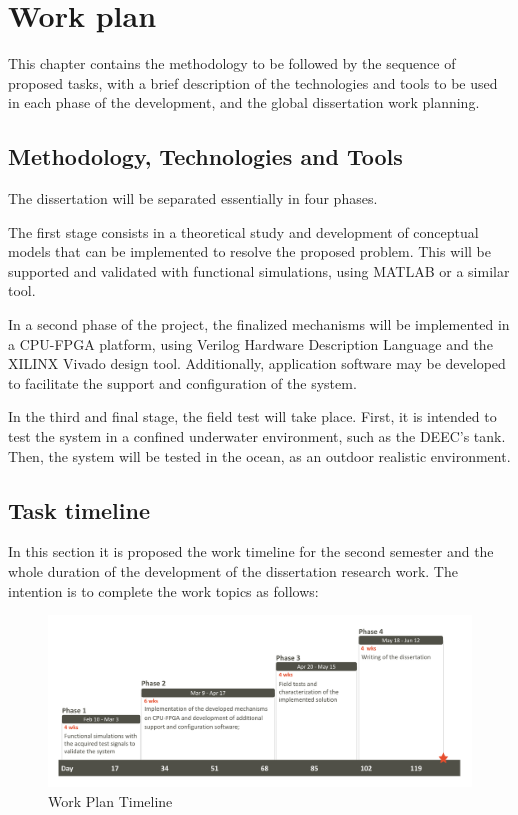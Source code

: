\chapter{Work plan}\label{chap:chap4}

This chapter contains the methodology to be followed by the sequence of proposed tasks, with a brief description of the technologies and tools to be used in each phase of the development, and the global dissertation work planning.

\section{Methodology, Technologies and Tools}

The dissertation will be separated essentially in four phases. 

The first stage consists in a theoretical study and development of conceptual models that can be implemented to resolve the proposed problem. This will be supported and validated with functional simulations, using MATLAB or a similar tool. 

In a second phase of the project, the finalized mechanisms will be implemented in a CPU-FPGA platform, using Verilog Hardware Description Language and the XILINX Vivado design tool. Additionally, application software may be developed to facilitate the support and configuration of the system.

In the third and final stage, the field test will take place. First, it is intended to test the system in a confined underwater environment, such as the DEEC's tank. Then, the system will be tested in the ocean, as an outdoor realistic environment.

\section{Task timeline}

In this section it is proposed the work timeline for the second semester and the whole duration of the development of the dissertation research work. The intention is to complete the work topics as follows:

\begin{figure}[!htbp]
	\centering
	\includegraphics[width=1.1\textwidth]{figures/timeline}
	\caption{Work Plan Timeline}
	\label{fig:timeline}
\end{figure}

